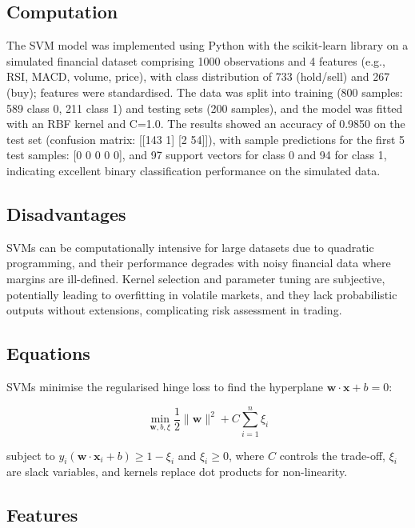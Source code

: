 \documentclass{article}
\begin{document}
\subsection{Computation}

The SVM model was implemented using Python with the scikit-learn library on a simulated financial dataset comprising 1000 observations and 4 features (e.g., RSI, MACD, volume, price), with class distribution of 733 (hold/sell) and 267 (buy); features were standardised. The data was split into training (800 samples: 589 class 0, 211 class 1) and testing sets (200 samples), and the model was fitted with an RBF kernel and C=1.0. The results showed an accuracy of 0.9850 on the test set (confusion matrix: [[143 1] [2 54]]), with sample predictions for the first 5 test samples: [0 0 0 0 0], and 97 support vectors for class 0 and 94 for class 1, indicating excellent binary classification performance on the simulated data.

\subsection{Disadvantages}

SVMs can be computationally intensive for large datasets due to quadratic programming, and their performance degrades with noisy financial data where margins are ill-defined. Kernel selection and parameter tuning are subjective, potentially leading to overfitting in volatile markets, and they lack probabilistic outputs without extensions, complicating risk assessment in trading.

\subsection{Equations}

SVMs minimise the regularised hinge loss to find the hyperplane $\mathbf{w} \cdot \mathbf{x} + b = 0$:

\[
\min_{\mathbf{w}, b, \xi} \frac{1}{2} \|\mathbf{w}\|^2 + C \sum_{i=1}^n \xi_i
\]

subject to $y_i (\mathbf{w} \cdot \mathbf{x}_i + b) \geq 1 - \xi_i$ and $\xi_i \geq 0$, where $C$ controls the trade-off, $\xi_i$ are slack variables, and kernels replace dot products for non-linearity.

\subsection{Features}
\end{document}
